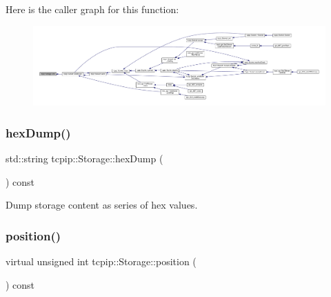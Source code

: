 Here is the caller graph for this function\+:
\nopagebreak
\begin{figure}[H]
\begin{center}
\leavevmode
\includegraphics[width=350pt]{classtcpip_1_1_storage_a42a2fec87e26a5a90f56e3d8201559e1_icgraph}
\end{center}
\end{figure}
\mbox{\label{classtcpip_1_1_storage_a841ce58366edb7bea45305614b98eaa4}} 
\subsubsection{\texorpdfstring{hex\+Dump()}{hexDump()}}
{\footnotesize\ttfamily std\+::string tcpip\+::\+Storage\+::hex\+Dump (\begin{DoxyParamCaption}{ }\end{DoxyParamCaption}) const}



Dump storage content as series of hex values. 

\mbox{\label{classtcpip_1_1_storage_a00c4b7b4c74ca5b5418177544bad8dc7}} 
\subsubsection{\texorpdfstring{position()}{position()}}
{\footnotesize\ttfamily virtual unsigned int tcpip\+::\+Storage\+::position (\begin{DoxyParamCaption}{ }\end{DoxyParamCaption}) const\hspace{0.3cm}{\ttfamily [virtual]}}

\mbox{\label{classtcpip_1_1_storage_aaf174f5fbce4103b3b60c6e5da18e9b5}} 
